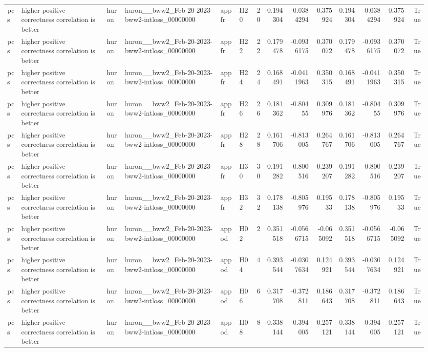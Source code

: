 \begin{longtable}{llllllrrrrrrrr}
pcs & higher positive correctness correlation is better & huron & huron\_\_bww2\_Feb-20-2023-bww2-intloss\_00000000 & appfr & H20 & 20 & 0.194304 & -0.0384294 & 0.375924 & 0.194304 & -0.0384294 & 0.375924 & True \\
pcs & higher positive correctness correlation is better & huron & huron\_\_bww2\_Feb-20-2023-bww2-intloss\_00000000 & appfr & H22 & 22 & 0.179478 & -0.0936175 & 0.370072 & 0.179478 & -0.0936175 & 0.370072 & True \\
pcs & higher positive correctness correlation is better & huron & huron\_\_bww2\_Feb-20-2023-bww2-intloss\_00000000 & appfr & H24 & 24 & 0.168491 & -0.0411963 & 0.350315 & 0.168491 & -0.0411963 & 0.350315 & True \\
pcs & higher positive correctness correlation is better & huron & huron\_\_bww2\_Feb-20-2023-bww2-intloss\_00000000 & appfr & H26 & 26 & 0.181362 & -0.80455 & 0.309976 & 0.181362 & -0.80455 & 0.309976 & True \\
pcs & higher positive correctness correlation is better & huron & huron\_\_bww2\_Feb-20-2023-bww2-intloss\_00000000 & appfr & H28 & 28 & 0.161706 & -0.813005 & 0.264767 & 0.161706 & -0.813005 & 0.264767 & True \\
pcs & higher positive correctness correlation is better & huron & huron\_\_bww2\_Feb-20-2023-bww2-intloss\_00000000 & appfr & H30 & 30 & 0.191282 & -0.800516 & 0.239207 & 0.191282 & -0.800516 & 0.239207 & True \\
pcs & higher positive correctness correlation is better & huron & huron\_\_bww2\_Feb-20-2023-bww2-intloss\_00000000 & appfr & H32 & 32 & 0.178138 & -0.805976 & 0.19533 & 0.178138 & -0.805976 & 0.19533 & True \\
pcs & higher positive correctness correlation is better & huron & huron\_\_bww2\_Feb-20-2023-bww2-intloss\_00000000 & appod & H02 & 2 & 0.351518 & -0.0566715 & -0.065092 & 0.351518 & -0.0566715 & -0.065092 & True \\
pcs & higher positive correctness correlation is better & huron & huron\_\_bww2\_Feb-20-2023-bww2-intloss\_00000000 & appod & H04 & 4 & 0.393544 & -0.0307634 & 0.124921 & 0.393544 & -0.0307634 & 0.124921 & True \\
pcs & higher positive correctness correlation is better & huron & huron\_\_bww2\_Feb-20-2023-bww2-intloss\_00000000 & appod & H06 & 6 & 0.317708 & -0.372811 & 0.186643 & 0.317708 & -0.372811 & 0.186643 & True \\
pcs & higher positive correctness correlation is better & huron & huron\_\_bww2\_Feb-20-2023-bww2-intloss\_00000000 & appod & H08 & 8 & 0.338144 & -0.394005 & 0.257121 & 0.338144 & -0.394005 & 0.257121 & True \\

\end{longtable}
